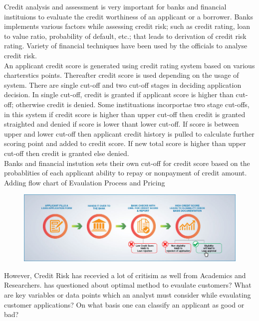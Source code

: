 {Credit analysis and assessment is very important for banks and financial instituions to evaluate the credit worthiness of an applicant or a borrower. Banks implements various factors while assessing credit risk; such as credit rating, loan to value ratio, probability of default, etc.; that leads to derivation of credit risk rating. Variety of financial techniques have been used by the officials to analyse credit risk.\\

An applicant credit score is generated using credit rating system based on various charterstics points. Thereafter credit score is used depending on the usage of system. There are single cut-off and two cut-off stages in deciding application decision. In single cut-off, credit is granted if applicant score is higher than cut-off; otherwise credit is denied. Some instituations incorportae two stage cut-offs, in this system if credit score is higher than upper cut-off then credit is granted straighted and denied if score is lower thant lower cut-off. If score is between upper and lower cut-off then applicant credit history is pulled to calculate further scoring point and added to credit score. If new total score is higher than upper cut-off then credit is granted else denied.\\

Banks and financial instution sets their own cut-off for credit score based on the probablities of each applicant ability to repay or nonpayment of credit amount.\\

Adding flow chart of Evaulation Process and Pricing
\begin{figure}
\includegraphics[width=\textwidth]{creditscoreflow.jpg}
\end{figure}

However, Credit Risk has recevied a lot of critisim as well from Academics and Researchers. \citet{al2002credit} has questioned about optimal method to evaulate customers? What are key variables or data points which an analyst must consider while evaulating customer applications? On what basis one can classify an applicant as good or bad?\\


}
